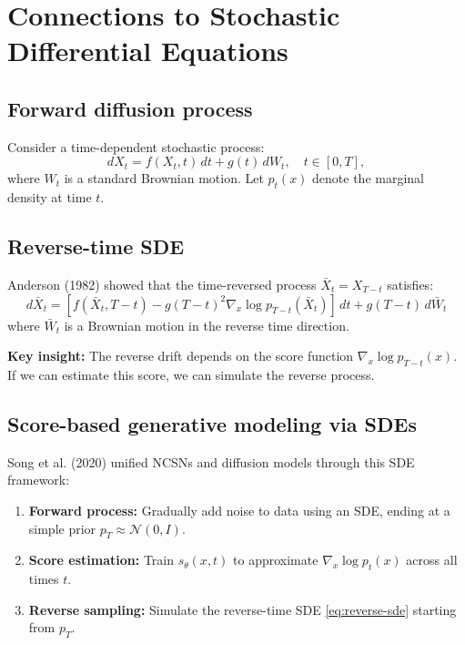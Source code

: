 \documentclass[11pt]{article}
\theoremstyle{definition}
\begin{document}
\section{Connections to Stochastic Differential Equations}

\subsection{Forward diffusion process}
Consider a time-dependent stochastic process:
\begin{equation}
dX_t = f(X_t, t)\,dt + g(t)\,dW_t, \quad t \in [0, T],
\end{equation}
where $W_t$ is a standard Brownian motion. 
Let $p_t(x)$ denote the marginal density at time $t$.

\subsection{Reverse-time SDE}
Anderson (1982) showed that the time-reversed process $\bar{X}_t = X_{T-t}$ satisfies:
\begin{equation}
\label{eq:reverse-sde}
\boxed{
d\bar{X}_t
= \left[f(\bar{X}_t,T-t) - g(T-t)^2 \nabla_x \log p_{T-t}(\bar{X}_t)\right]\,dt
+ g(T-t)\, d\bar{W}_t
}
\end{equation}
where $\bar{W}_t$ is a Brownian motion in the reverse time direction.

\textbf{Key insight:} The reverse drift depends on the score function $\nabla_x \log p_{T-t}(x)$. 
If we can estimate this score, we can simulate the reverse process.

\subsection{Score-based generative modeling via SDEs}
Song et al. (2020) unified NCSNs and diffusion models through this SDE framework:
\begin{enumerate}
\item \textbf{Forward process:} Gradually add noise to data using an SDE, ending at a simple prior $p_T \approx \mathcal{N}(0, I)$.
\item \textbf{Score estimation:} Train $s_\theta(x, t)$ to approximate $\nabla_x \log p_t(x)$ across all times $t$.
\item \textbf{Reverse sampling:} Simulate the reverse-time SDE \eqref{eq:reverse-sde} starting from $p_T$.
\end{enumerate}
\end{document}
